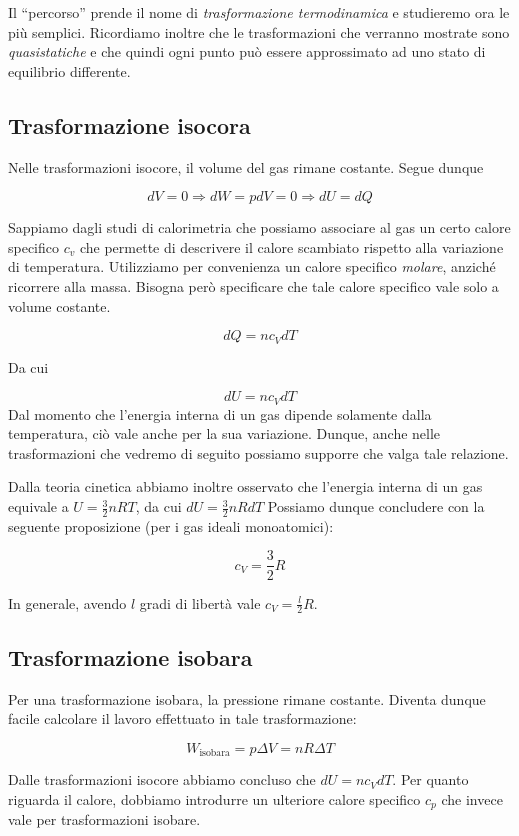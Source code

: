 Il ``percorso'' prende il nome di \textit{trasformazione termodinamica}
e studieremo ora le più semplici. Ricordiamo inoltre che le
trasformazioni che verranno mostrate sono \textit{quasistatiche}
e che quindi ogni punto può essere approssimato ad uno stato di
equilibrio differente.

\subsection*{Trasformazione isocora}
Nelle trasformazioni isocore, il volume del gas rimane costante.
Segue dunque

\[ dV = 0 \Rightarrow dW = pdV = 0 \Rightarrow dU = dQ \]

\noindent Sappiamo dagli studi di calorimetria che possiamo associare al
gas un certo calore specifico $c_v$ che permette di descrivere il calore
scambiato rispetto alla variazione di temperatura. Utilizziamo per
convenienza un calore specifico \textit{molare}, anziché ricorrere
alla massa. Bisogna però specificare che tale calore specifico
vale solo a volume costante.

\[ dQ = nc_VdT \]

Da cui

\[ dU = nc_VdT \]
Dal momento che l'energia interna di un gas dipende solamente dalla
temperatura, ciò vale anche per la sua variazione. Dunque, anche
nelle trasformazioni che vedremo di seguito possiamo supporre che
valga tale relazione.

Dalla teoria cinetica abbiamo inoltre osservato che l'energia
interna di un gas equivale a $U = \frac32nRT$, da cui
$dU = \frac32nRdT$
Possiamo dunque concludere con la seguente proposizione (per i
gas ideali monoatomici):

\[ c_V = \frac{3}{2}R \]

\noindent In generale, avendo $l$ gradi di libertà vale $c_V = \frac{l}{2}R$.

\subsection*{Trasformazione isobara}
Per una trasformazione isobara, la pressione rimane costante.
Diventa dunque facile calcolare il lavoro effettuato in tale
trasformazione:

\[ W_\text{isobara} = p\Delta V = nR\Delta T \]

\noindent Dalle trasformazioni isocore abbiamo concluso che $dU = nc_VdT$.
Per quanto riguarda il calore, dobbiamo introdurre un ulteriore
calore specifico $c_p$ che invece vale per trasformazioni isobare.

